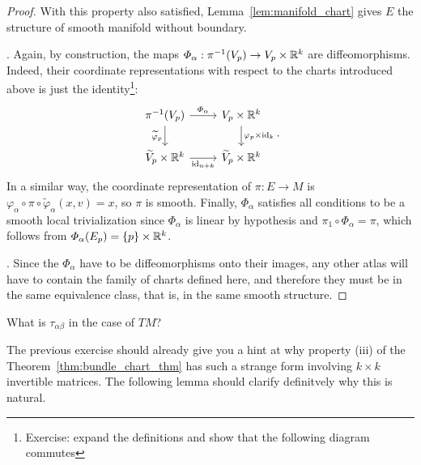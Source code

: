 \begin{proof}
With this property also satisfied, Lemma~\ref{lem:manifold_chart} gives $E$ the structure of smooth manifold without boundary.

.
Again, by construction, the maps $\varPhi_\alpha : \pi^{-1}(V_p) \to V_p\times\mathbb{R}^k$ are diffeomorphisms.
Indeed, their coordinate representations with respect to the charts introduced above is just the identity\footnote{Exercise: expand the definitions and show that the following diagram commutes}:
\begin{equation}
  \begin{tikzcd}
    {\pi^{-1}(V_p)} & {V_p\times\R^k} \\
    {\widetilde{V}_p\times\R^k} & {\widetilde{V}_p\times\R^k}
    \arrow["{\varPhi_\alpha}", from=1-1, to=1-2]
    \arrow["{\varphi_p\times\id_k}", from=1-2, to=2-2]
    \arrow["{\widetilde{\varphi}_p}"', from=1-1, to=2-1]
    \arrow["{\id_{n+k}}"', from=2-1, to=2-2]
  \end{tikzcd}.
\end{equation}
In a similar way, the coordinate representation of $\pi : E \to M$ is $\varphi_\alpha \circ \pi \circ \widetilde{\varphi}_\alpha (x,v) = x$, so $\pi$ is smooth.
Finally, $\Phi_\alpha$ satisfies all conditions to be a smooth local trivialization since $\varPhi_\alpha$ is linear by hypothesis and $\pi_1 \circ \varPhi_\alpha = \pi$, which follows from $\varPhi_\alpha(E_p) = \{p\}\times \mathbb{R}^k$.

.
Since the $\varPhi_\alpha$ have to be diffeomorphisms onto their images, any other atlas will have to contain the family of charts defined here, and therefore they must be in the same equivalence class, that is, in the same smooth structure.
\end{proof}

\begin{exercise}
  What is $\tau_{\alpha\beta}$ in the case of $TM$?
\end{exercise}

The previous exercise should already give you a hint at why property (iii) of the Theorem~\ref{thm:bundle_chart_thm} has such a strange form involving $k\times k$ invertible matrices.
The following lemma should clarify definitvely why this is natural.

